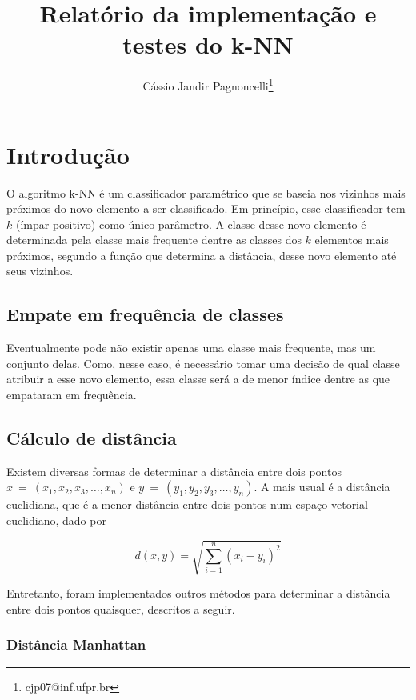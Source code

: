 \documentclass[10pt,a4paper,twocolumn]{article}
\title{Relatório da implementação e testes do k-NN}
\author{\small{Cássio Jandir Pagnoncelli\footnote{cjp07@inf.ufpr.br}}}
\newcommand{\parenteses}[1] {\left ( {#1} \right )}
\begin{document}
\flushbottom
\maketitle

\section{Introdução}

  O algoritmo k-NN é um classificador paramétrico que se baseia nos vizinhos
  mais próximos do novo elemento a ser classificado. Em princípio, esse
  classificador tem $k$ (ímpar positivo) como único parâmetro. A classe desse
  novo elemento é determinada pela classe mais frequente dentre as classes dos
  $k$ elementos mais próximos, segundo a função que determina a distância, desse
  novo elemento até seus vizinhos.

  \subsection{Empate em frequência de classes}

    Eventualmente pode não existir apenas uma classe mais frequente, mas um
    conjunto delas. Como, nesse caso, é necessário tomar uma decisão de qual
    classe atribuir a esse novo elemento, essa classe será a de menor índice
    dentre as que empataram em frequência.

  \subsection{Cálculo de distância}

    Existem diversas formas de determinar a distância entre dois pontos
    $x~=~(x_1,x_2,x_3,\ldots,x_n)$ e $y~=~(y_1,y_2,y_3,\ldots,y_n)$. A mais
    usual é a distância euclidiana, que é a menor distância entre dois pontos
    num espaço vetorial euclidiano, dado por

    \begin{equation*}
      d(x, y) = \sqrt{\sum_{i=1}^n \parenteses{x_i - y_i}^2}
    \end{equation*}

    Entretanto, foram implementados outros métodos para determinar a distância
    entre dois pontos quaisquer, descritos a seguir.

    \subsubsection*{Distância Manhattan}
\end{document}
